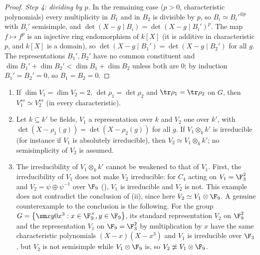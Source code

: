 \begin{proof}
\emph{Step 4: dividing by $p$.} In the remaining case ($p>0$, characteristic polynomials) every multiplicity in $B_1$ and in $B_2$ is divisible
by $p$, so $B_i\simeq B_i'^{\oplus p}$ with $B_i'$ semisimple, and $\det(X-g\mid B_i)=\det(X-g\mid B_i')^p$. The map $f\mapsto f^p$ is an injective ring
endomorphism of $k[X]$ (it is additive in characteristic $p$, and $k[X]$ is a domain), so $\det(X-g\mid B_1')=\det(X-g\mid B_2')$ for all $g$. The
representations $B_1',B_2'$ have no common constituent and $\dim B_1'+\dim B_2'<\dim B_1+\dim B_2$ unless both are $0$; by induction $B_1'=B_2'=0$,
so $B_1=B_2=0$.
\end{proof}

\begin{corollary}\label{cor:reps:bn-consequences}
\begin{enumerate}[label=(\roman*)]
\item If $\dim V_1=\dim V_2=2$, $\det\rho_1=\det\rho_2$ and $\tr\rho_1=\tr\rho_2$ on $G$, then $V_1^{ss}\simeq V_2^{ss}$ (in every characteristic).
\item Let $k\subseteq k'$ be fields, $V_1$ a representation over $k$ and $V_2$ one over $k'$, with $\det(X-\rho_1(g))=\det(X-\rho_2(g))$ for all $g$. If
$V_1\otimes_kk'$ is irreducible (for instance if $V_1$ is absolutely irreducible), then $V_2\simeq V_1\otimes_kk'$; no semisimplicity of $V_2$ is
assumed.
\item The irreducibility of $V_1\otimes_kk'$ cannot be weakened to that of $V_1$. First, the irreducibility of $V_1$ does not make $V_2$
irreducible: for $C_4$ acting on $V_1=\F_3^2$ and $V_2=\psi\oplus\psi^{-1}$ over $\F_9$ (), $V_1$ is irreducible and $V_2$ is not. This
example does not contradict the conclusion of (ii), since here $V_2\simeq V_1\otimes\F_9$. A genuine counterexample to the conclusion is the
following. For the group $G=\bigl\{\sm x y0{x^3}:x\in\F_9^\times,y\in\F_9\bigr\}$, its standard
representation $V_2$ on $\F_9^2$ and the representation $V_1$ on $\F_9=\F_3^2$ by multiplication by $x$ have the same characteristic
polynomials $(X-x)(X-x^3)$ and $V_1$ is irreducible over $\F_3$, but $V_2$ is not semisimple while $V_1\otimes\F_9$ is, so $V_2\not\simeq V_1\otimes\F_9$.
\end{enumerate}
\end{corollary}

